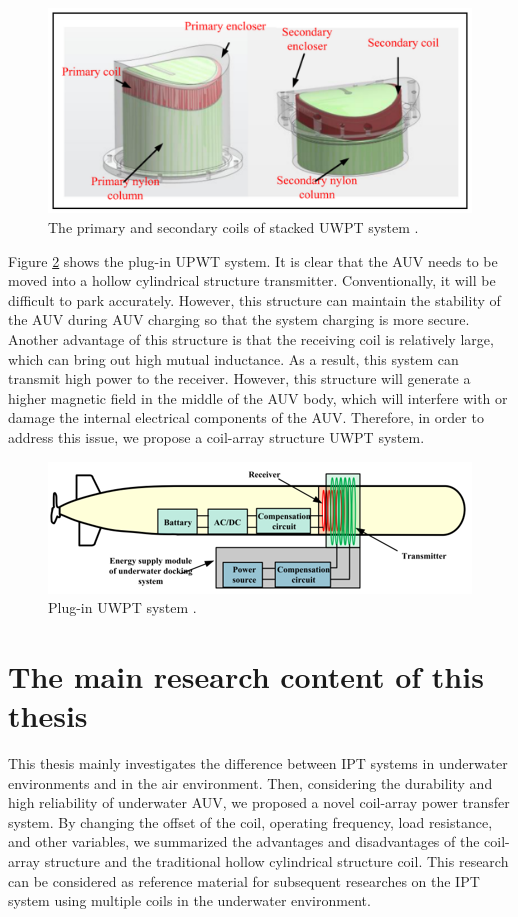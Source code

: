 \begin{figure}[!b]
    \centering
    \includegraphics[width=0.7\linewidth]{images/1_stacked_UWPT_system_details.png}
    \caption{The primary and secondary coils of stacked UWPT system \cite{Song}.}
    \label{fig:stacked UWPT system detail}
\end{figure}

Figure \ref{fig:plug in UWPT system} shows the plug-in UPWT system. 
It is clear that the AUV needs to be moved into a hollow cylindrical structure transmitter.
Conventionally, it will be difficult to park accurately. 
However, this structure can maintain the stability of the AUV during AUV charging so that the system charging is more secure. 
Another advantage of this structure is that the receiving coil is relatively large, which can bring out high mutual inductance. 
As a result, this system can transmit high power to the receiver.
However, this structure will generate a higher magnetic field in the middle of the AUV body, which will interfere with or damage the internal electrical components of the AUV.
Therefore, in order to address this issue, we propose a coil-array structure UWPT system.
\begin{figure}[!t]
    \centering
    \includegraphics[width=0.7\linewidth]{images/1_plugin_UWPT_system.png}
    \caption{Plug-in UWPT system \cite{Wang2019}.}
    \label{fig:plug in UWPT system}
\end{figure}


\section{The main research content of this thesis}
This thesis mainly investigates the difference between IPT systems in underwater environments and in the air environment. 
Then, considering the durability and high reliability of underwater AUV, we proposed a novel coil-array power transfer system. 
By changing the offset of the coil, operating frequency, load resistance, and other variables, we summarized the advantages and disadvantages of the coil-array structure and the traditional hollow cylindrical structure coil.
This research can be considered as reference material for subsequent researches on the IPT system using multiple coils in the underwater environment.

